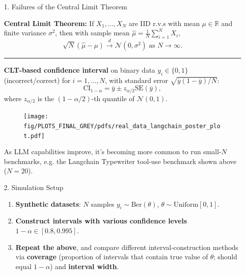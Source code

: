 \documentclass[final]{beamer}
\newlength{\sepwidth}
\newlength{\colwidth}
\newcommand{\separatorcolumn}{\begin{column}{\sepwidth}\end{column}}
\begin{document}
\begin{frame}[fragile]
\begin{columns}[t]
\separatorcolumn

\begin{column}{\colwidth}

  \begin{exampleblock}{1. Failures of the Central Limit Theorem}

    \textbf{Central Limit Theorem:}
    If $X_1, \ldots, X_N$ are IID r.v.s with mean $\mu \in \mathbb{R}$ and finite variance $\sigma^2$, then with sample mean $\hat{\mu} = \frac{1}{N}\sum_{i=1}^N X_i$,
    $$\sqrt{N} (\hat{\mu} - \mu) \xrightarrow{d} \mathcal{N} \left( 0, \sigma^2 \right) \; \text{as } N \rightarrow \infty.$$

    \begin{center}
      \rule{0.8\textwidth}{0.4pt}
    \end{center}

    \textbf{CLT-based confidence interval} on binary data $y_i \in \{0, 1\}$ (incorrect/correct) for $i=1,\ldots,N$, with standard error $\sqrt{\bar{y}(1-\bar{y})/N}$:
    $$
    \text{CI}_{1-\alpha} = \bar{y} \pm z_{\alpha/2} \text{SE}(\bar{y}),
    $$
    where $z_{\alpha/2}$ is the $(1-\alpha/2)$-th quantile of $\mathcal{N}(0, 1)$.

    \begin{figure}
      \centering
      \texttt{[image: fig/PLOTS\_FINAL\_GREY/pdfs/real\_data\_langchain\_poster\_plot.pdf]}
    \end{figure}

    As LLM capabilities improve, it's becoming more common to run small-$N$ benchmarks, e.g. the Langchain Typewriter tool-use benchmark shown above ($N=20$).
    
  \end{exampleblock}

  \begin{exampleblock}{2. Simulation Setup}

    \begin{enumerate}
      \item \textbf{Synthetic datasets}: $N$ samples $y_i \sim \text{Ber}(\theta)$, $\theta \sim \text{Uniform}[0, 1]$.
      \item \textbf{Construct intervals with various confidence levels} $1-\alpha \in [0.8, 0.995]$.
      \item \textbf{Repeat the above}, and compare different interval-construction methods via \textbf{coverage} (proportion of intervals that contain true value of $\theta$; should equal $1-\alpha$) and \textbf{interval width}.
    \end{enumerate}


\end{exampleblock}
\end{column}
\end{columns}
\end{frame}
\end{document}
